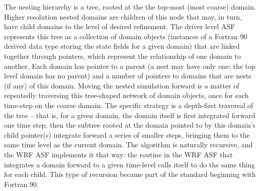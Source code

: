 The nesting hierarchy is a tree, rooted at the the top-most (most
coarse) domain.  Higher resolution nested domains are children of this
node that may, in turn, have child domains to the level of desired
refinement.  The driver level ASF represents this tree as a collection
of domain objects (instances of a Fortran 90 derived data type storing
the state fields for a given domain) that are linked together through
pointers, which represent the relationship of one domain to another.
Each domain has pointer to a parent (a nest may have only one; the top
level domain has no parent) and a number of pointers to domains that
are nests (if any) of this domain. Moving the nested simulation forward
is a matter of repeatedly traversing this tree-shaped network of domain
objects, once for each time-step on the coarse domain. The specific
strategy is a depth-first traversal of the tree -- that is, for a given
domain, the domain itself is first integrated forward one time step,
then the subtree rooted at the domain pointed to by this domain's child
pointer(s) integrate forward a series of smaller steps, bringing them
to the same time level as the current domain.  The algorithm is
naturally recursive, and the WRF ASF implements it that way: the routine
in the WRF ASF that integrates a domain forward to a given time-level
calls itself to do the same thing for each child.  This type of
recursion 
became part of the standard beginning with
Fortran 90.

